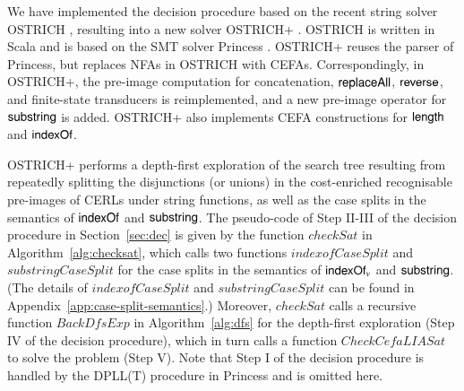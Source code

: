 
We have implemented the decision procedure based on the recent string solver OSTRICH \cite{CHL+19}, resulting into a new solver OSTRICH+ . OSTRICH is  written in Scala and is based on the SMT solver Princess \cite{princess08}. 
OSTRICH+ reuses the parser of Princess, but replaces NFAs in OSTRICH with CEFAs. Correspondingly, in OSTRICH+, the pre-image  computation for concatenation, $\mathsf{replaceAll}$, $\mathsf{reverse}$, and finite-state transducers is reimplemented, and a new pre-image operator for $\mathsf{substring}$ is added. OSTRICH+ also implements CEFA constructions for $\mathsf{length}$ and $\mathsf{indexOf}$.  

OSTRICH+ performs a depth-first exploration of the search tree resulting from repeatedly
splitting the disjunctions (or unions) in the cost-enriched recognisable pre-images of CERLs under string functions, as well as the case splits in the semantics of $\mathsf{indexOf}$ and $\mathsf{substring}$.
The pseudo-code of Step II-III of the decision procedure in Section~\ref{sec:dec} is given by  the function $\mathit{checkSat}$ in Algorithm~\ref{alg:checksat}, which calls two functions $\mathit{indexofCaseSplit}$ and $\mathit{substringCaseSplit}$ for the case splits in the semantics of $\mathsf{indexOf}_v$ and $\mathsf{substring}$. (The details of $\mathit{indexofCaseSplit}$ and $\mathit{substringCaseSplit}$ can be found in Appendix~\ref{app:case-split-semantics}.) Moreover,  $\mathit{checkSat}$ calls a recursive function  $\mathit{BackDfsExp}$ in Algorithm~\ref{alg:dfs} for the depth-first exploration (Step IV of the decision procedure), which in turn calls a function $\mathit{CheckCefaLIASat}$ to solve the {\lasat} problem (Step V). Note that Step I of the decision procedure is handled by the DPLL(T) procedure in Princess and is omitted here. 

